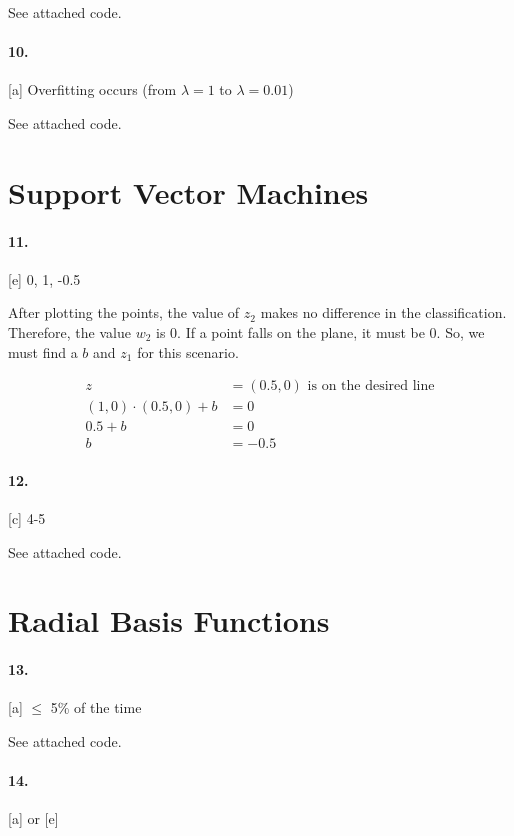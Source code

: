 \documentclass[titlepage]{article}
\begin{document}
	See attached code.

\paragraph{10.} [a] Overfitting occurs (from $\lambda = 1$ to $\lambda = 0.01$)

	See attached code.

\section*{Support Vector Machines}
\paragraph{11.} [e] 0, 1, -0.5

	After plotting the points, the value of $z_2$ makes no difference in the classification. Therefore, the value $w_2$ is 0. If a point falls on the plane, it must be 0. So, we must find a $b$ and $z_1$ for this scenario.

	\begin{align*}
	z &= (0.5, 0) \text{ is on the desired line} \\
	(1, 0)\cdot(0.5,0) + b &= 0 \\
	0.5 + b &= 0 \\
	b &= -0.5
	\end{align*}

\paragraph{12.} [c] 4-5

	See attached code.

\section*{Radial Basis Functions}
\paragraph{13.} [a] $\leq$ 5\% of the time

	See attached code.

\paragraph{14.} [a] or [e]
\end{document}
